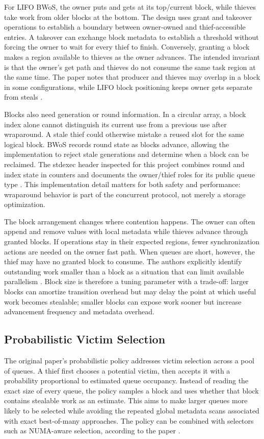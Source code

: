 \documentclass[conference]{IEEEtran}
\begin{document}
For LIFO BWoS, the owner puts and gets at its top/current block, while thieves take work from older blocks at the bottom. The design uses grant and takeover operations to establish a boundary between owner-owned and thief-accessible entries. A takeover can exchange block metadata to establish a threshold without forcing the owner to wait for every thief to finish. Conversely, granting a block makes a region available to thieves as the owner advances. The intended invariant is that the owner's get path and thieves do not consume the same task region at the same time. The paper notes that producer and thieves may overlap in a block in some configurations, while LIFO block positioning keeps owner gets separate from steals \cite{wang2023bwos}.

Blocks also need generation or round information. In a circular array, a block index alone cannot distinguish its current use from a previous use after wraparound. A stale thief could otherwise mistake a reused slot for the same logical block. BWoS records round state as blocks advance, allowing the implementation to reject stale generations and determine when a block can be reclaimed. The stdexec header inspected for this project combines round and index state in counters and documents the owner/thief roles for its public queue type \cite{nvidia_stdexec}. This implementation detail matters for both safety and performance: wraparound behavior is part of the concurrent protocol, not merely a storage optimization.

The block arrangement changes where contention happens. The owner can often append and remove values with local metadata while thieves advance through granted blocks. If operations stay in their expected regions, fewer synchronization actions are needed on the owner fast path. When queues are short, however, the thief may have no granted block to consume. The authors explicitly identify outstanding work smaller than a block as a situation that can limit available parallelism \cite{wang2023bwos}. Block size is therefore a tuning parameter with a trade-off: larger blocks can amortize transition overhead but may delay the point at which useful work becomes stealable; smaller blocks can expose work sooner but increase advancement frequency and metadata overhead.

\subsection{Probabilistic Victim Selection}
The original paper's probabilistic policy addresses victim selection across a pool of queues. A thief first chooses a potential victim, then accepts it with a probability proportional to estimated queue occupancy. Instead of reading the exact size of every queue, the policy samples a block and uses whether that block contains stealable work as an estimate. This aims to make larger queues more likely to be selected while avoiding the repeated global metadata scans associated with exact best-of-many approaches. The policy can be combined with selectors such as NUMA-aware selection, according to the paper \cite{wang2023bwos}.
\end{document}
